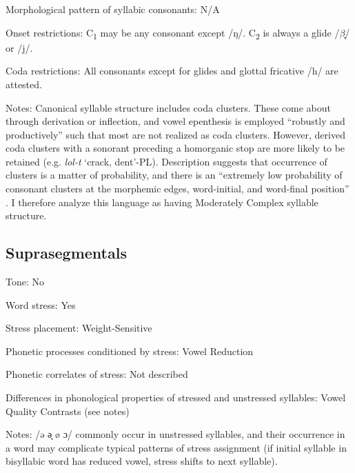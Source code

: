 {\begin{appendixdesc}
\item[Morphological pattern of syllabic consonants:] N/A

\item[Onset restrictions:] C\textsubscript{1} may be any consonant except /ŋ/. C\textsubscript{2} is always a glide /$\beta ̞$/ or /j/.

\item[Coda restrictions:] All consonants except for glides and glottal fricative /h/ are attested. 

\item[Notes:] Canonical syllable structure includes coda clusters. These come about through derivation or inflection, and vowel epenthesis is employed “robustly and productively” such that most are not realized as coda clusters. However, derived coda clusters with a sonorant preceding a homorganic stop are more likely to be retained (e.g. \textit{lol-t} ‘crack, dent’-PL). Description suggests that occurrence of clusters is a matter of probability, and there is an “extremely low probability of consonant clusters at the morphemic edges, word-initial, and word-final position” \citep[55]{Filchenko2007}. I therefore analyze this language as having Moderately Complex syllable structure.
\end{appendixdesc}
\subsection*{Suprasegmentals}
\begin{appendixdesc}
\item[Tone:] No

\item[Word stress:] Yes

\item[Stress placement:] Weight-Sensitive

\item[Phonetic processes conditioned by stress:] Vowel Reduction

\item[Phonetic correlates of stress:] Not described

\item[Differences in phonological properties of stressed and unstressed syllables:] Vowel Quality Contrasts (see notes)

\item[Notes:] /ə ə̘ ø ɔ/ commonly occur in unstressed syllables, and their occurrence in a word may complicate typical patterns of stress assignment (if initial syllable in bisyllabic word has reduced vowel, stress shifts to next syllable).
\end{appendixdesc}
}
